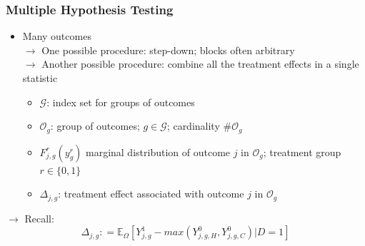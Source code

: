 \documentclass[static]{JJH-Beamer}
\begin{document}
\begin{frame}
\frametitle{Multiple Hypothesis Testing}
\begin{itemize}
\item Many outcomes \\
	$\rightarrow$ One possible procedure: step-down; blocks often arbitrary \\
    $\rightarrow$ Another possible procedure: combine all the treatment effects in a single statistic

\begin{itemize}	
	\item $\mathcal{G}$: index set for groups of outcomes
	\item $\mathcal{O}_g$: group of outcomes; $g \in \mathcal{G}$; cardinality $\#\mathcal{O}_g$
	\item $F_{j,g}^r \left( y_g^r \right)$ marginal distribution of outcome $j$ in $\mathcal{O}_g$; treatment group $r \in \{0, 1\}$
	\item $\Delta_{j,g}$: treatment effect associated with outcome $j$ in $\mathcal{O}_g$ 
\end{itemize}	
\end{itemize}
$\rightarrow$ Recall:
\begin{equation}
\Delta_{j,g} : = \mathbb{E}_{\Omega} \left[ Y^1_{j,g} - max \left( Y_{j,g,H}^0, Y_{j,g,C}^0 \right)  | D = 1\right] 
\end{equation}
\end{frame}
\end{document}
